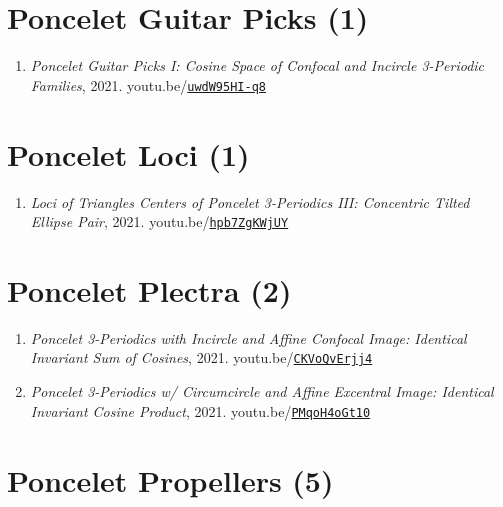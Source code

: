 \documentclass[12pt]{article}
\begin{document}
\section{Poncelet Guitar Picks (1)}

\begin{enumerate}[resume]
\item \textit{Poncelet Guitar Picks I: Cosine Space of Confocal and Incircle 3-Periodic Families}, 2021. youtu.be/\href{https://youtu.be/uwdW95HI-q8}{\nolinkurl{uwdW95HI-q8}}
\end{enumerate}

\section{Poncelet Loci (1)}

\begin{enumerate}[resume]
\item \textit{Loci of Triangles Centers of Poncelet 3-Periodics III: Concentric Tilted Ellipse Pair}, 2021. youtu.be/\href{https://youtu.be/hpb7ZgKWjUY}{\nolinkurl{hpb7ZgKWjUY}}
\end{enumerate}

\section{Poncelet Plectra (2)}

\begin{enumerate}[resume]
\item \textit{Poncelet 3-Periodics with Incircle and Affine Confocal Image: Identical Invariant Sum of Cosines}, 2021. youtu.be/\href{https://youtu.be/CKVoQvErjj4}{\nolinkurl{CKVoQvErjj4}}
\item \textit{Poncelet 3-Periodics w/ Circumcircle and Affine Excentral Image: Identical Invariant Cosine Product}, 2021. youtu.be/\href{https://youtu.be/PMqoH4oGt10}{\nolinkurl{PMqoH4oGt10}}
\end{enumerate}

\section{Poncelet Propellers (5)}
\end{document}
